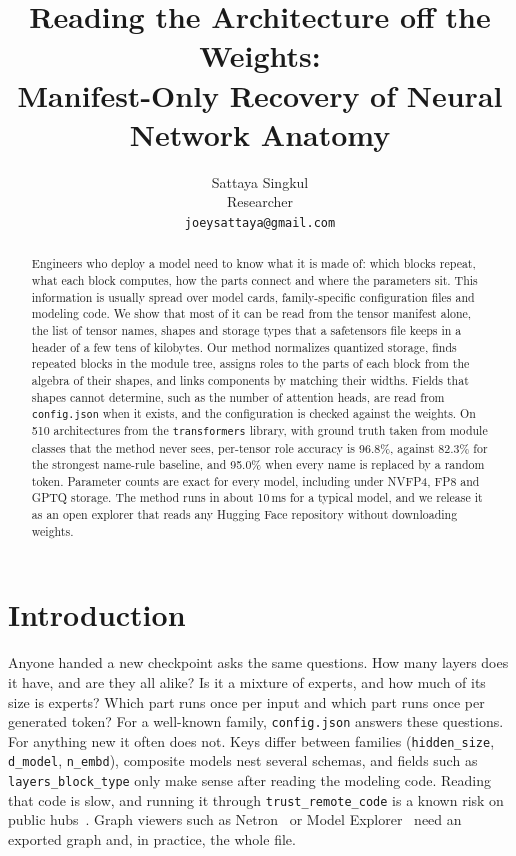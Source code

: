 \documentclass[11pt]{article}
\title{\textbf{Reading the Architecture off the Weights:\\ Manifest-Only Recovery of Neural Network Anatomy}}
\author{Sattaya Singkul\\ Researcher\\ \texttt{joeysattaya@gmail.com}}
\date{}
\newcommand{\tn}[1]{\texttt{#1}}
\begin{document}
\maketitle

\begin{abstract}
Engineers who deploy a model need to know what it is made of: which blocks repeat, what each block computes, how the parts connect and where the parameters sit. This information is usually spread over model cards, family-specific configuration files and modeling code. We show that most of it can be read from the tensor manifest alone, the list of tensor names, shapes and storage types that a safetensors file keeps in a header of a few tens of kilobytes. Our method normalizes quantized storage, finds repeated blocks in the module tree, assigns roles to the parts of each block from the algebra of their shapes, and links components by matching their widths. Fields that shapes cannot determine, such as the number of attention heads, are read from \tn{config.json} when it exists, and the configuration is checked against the weights. On 510 architectures from the \tn{transformers} library, with ground truth taken from module classes that the method never sees, per-tensor role accuracy is 96.8\%, against 82.3\% for the strongest name-rule baseline, and 95.0\% when every name is replaced by a random token. Parameter counts are exact for every model, including under NVFP4, FP8 and GPTQ storage. \RBabstract{} The method runs in about 10\,ms for a typical model, and we release it as an open explorer that reads any Hugging Face repository without downloading weights.
\end{abstract}

\section{Introduction}

Anyone handed a new checkpoint asks the same questions. How many layers does it have, and are they all alike? Is it a mixture of experts, and how much of its size is experts? Which part runs once per input and which part runs once per generated token? For a well-known family, \tn{config.json} answers these questions. For anything new it often does not. Keys differ between families (\tn{hidden\_size}, \tn{d\_model}, \tn{n\_embd}), composite models nest several schemas, and fields such as \tn{layers\_block\_type} only make sense after reading the modeling code. Reading that code is slow, and running it through \tn{trust\_remote\_code} is a known risk on public hubs~\citep{zhao2024modelsarecodes}. Graph viewers such as Netron~\citep{netron} or Model Explorer~\citep{modelexplorer2024} need an exported graph and, in practice, the whole file.
\end{document}
